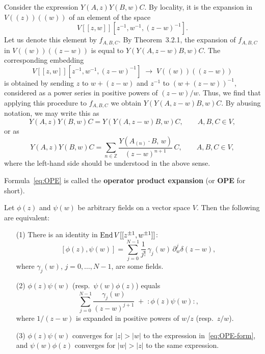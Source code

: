 \documentclass[12pt]{article}
\begin{document}
Consider the expression $Y(A,z)Y(B,w)C$. 
By locality, it is the expansion in $V((z))((w))$ of an element of the space
\[
V[[z,w]][z^{-1},w^{-1},(z-w)^{-1}].
\]
Let us denote this element by $f_{A,B,C}$. 
By Theorem~3.2.1, the expansion of $f_{A,B,C}$ in $V((w))((z-w))$ 
is equal to $Y(Y(A,z-w)B,w)C$. 
The corresponding embedding
\[
V[[z,w]][z^{-1},w^{-1},(z-w)^{-1}] \;\to\; V((w))((z-w))
\]
is obtained by sending $z$ to $w+(z-w)$ and $z^{-1}$ to $(w+(z-w))^{-1}$,
considered as a power series in positive powers of $(z-w)/w$.
Thus, we find that applying this procedure to $f_{A,B,C}$ 
we obtain $Y(Y(A,z-w)B,w)C$.
By abusing notation, we may write this as
\[
Y(A,z)Y(B,w)C = Y(Y(A,z-w)B,w)C, \qquad A,B,C\in V,
\]
or as
\begin{equation}
\label{eq:OPE}
Y(A,z)Y(B,w)C = 
\sum_{n\in\mathbb{Z}} \frac{Y(A_{(n)}\cdot B,\,w)}{(z-w)^{n+1}}\,C,
\qquad A,B,C\in V,
\end{equation}
where the left-hand side should be understood in the above sense.
\begin{definition}
    Formula~\eqref{eq:OPE} is called the \textbf{operator product expansion} (or \textbf{OPE} for short).
\end{definition}

\begin{proposition}
Let $\phi(z)$ and $\psi(w)$ be arbitrary fields on a vector space $V$. 
Then the following are equivalent:
\begin{enumerate}
\item[(1)] There is an identity in $\operatorname{End} V[[z^{\pm1},w^{\pm1}]]$:
\begin{equation}\label{eq:delta-commutator}
[\phi(z),\psi(w)]
= \sum_{j=0}^{N-1} \frac{1}{j!}\,\gamma_j(w)\,\partial_w^{j}\delta(z-w),
\end{equation}
where $\gamma_j(w)$, $j=0,\dots,N-1$, are some fields.
\item[(2)] $\phi(z)\psi(w)$ (resp.\ $\psi(w)\phi(z)$) equals
\begin{equation}\label{eq:OPE-form}
\sum_{j=0}^{N-1} \frac{\gamma_j(w)}{(z-w)^{j+1}} 
\;+\;
:\phi(z)\psi(w):,
\end{equation}
where $1/(z-w)$ is expanded in positive powers of $w/z$ 
(resp.\ $z/w$).
\item[(3)] $\phi(z)\psi(w)$ converges for $|z|>|w|$ to the expression
in~\eqref{eq:OPE-form}, and $\psi(w)\phi(z)$ converges for $|w|>|z|$
to the same expression.
\end{enumerate}
\end{proposition}
\end{document}
